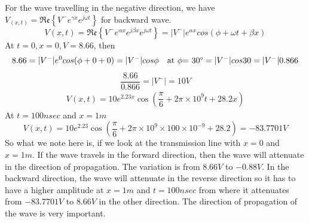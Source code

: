 \begin{exmp}
For the wave travelling in the negative direction, we have $V_{(x,t)} = \mathfrak{Re}\left\lbrace V^{-}e^{\gamma x}e^{j\omega t}\right\rbrace$ for backward wave.
\begin{dmath*}
V(x,t) = \mathfrak{Re}\left\lbrace{V^{-}e^{\alpha x}e^{j\beta x}e^{j\omega t}}\right\rbrace = |V^{-}|e^{\alpha x}cos{(\phi+\omega t + \beta x)}
\end{dmath*}
At ${t=0, x=0, V=8.66}$, then
\begin{dmath*}
{8.66} = {|V^{-}|}e^{0} cos({\phi + 0 + 0})
= {|V^-|{cos\phi}} \quad \text{at }\phi\text{= 30\textdegree} 
= {|V^-|{cos30}}
= {|V^-|{0.866}}
\end{dmath*}
\begin{dmath*}
\frac{8.66}{0.866} = {|V^-|} = 10V
\end{dmath*}
\begin{align*}
V({x,t}) = 10e^{2.23x} \cos({\dfrac{\pi}{6} + 2\pi\times10^9t + 28.2x})
\end{align*}
At ${t=100nsec}$ and ${x=1m}$
\begin{dmath*}
V({x,t}) = 10e^{2.23} \cos({\dfrac{\pi}{6} + 2\pi\times10^9\times100\times10^{-9} + 28.2})
= -83.7701V
\end{dmath*}
So what we note here is, if we look at the transmission line with ${x=0}$ and ${x=1m}$. If the wave travels in the forward direction, then the wave will attenuate in the direction of propagation. The variation is from ${8.66V}$ to ${-0.88V}$. In the backward direction, the wave will attenuate in the reverse direction so it has to have a higher amplitude at ${x=1m}$ and ${t=100nsec}$ from where it attenuates from ${-83.7701V}$ to ${8.66V}$ in the other direction. The direction of propagation of the wave is very important.
\end{exmp}



